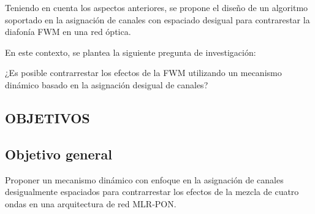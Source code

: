 Teniendo en cuenta los aspectos anteriores, se propone el diseño de un algoritmo soportado en la asignación de canales con espaciado desigual para contrarestar la diafonía FWM en una red óptica.


En este contexto, se plantea la siguiente pregunta de investigación:

¿Es posible contrarrestar los efectos de la FWM utilizando un mecanismo dinámico basado en la asignación desigual de canales?




\begin{center}
    \item  \section{OBJETIVOS}
\end{center}

\subsection{Objetivo general}

Proponer un mecanismo dinámico con enfoque en la asignación de canales desigualmente espaciados para contrarrestar los efectos de la mezcla de cuatro ondas en una arquitectura de red MLR-PON.


